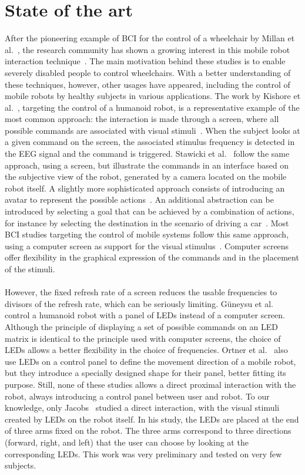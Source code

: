 \documentclass[smallextended]{svjour3}
\begin{document}
\section{State of the art}
\label{sec:soa}
After the pioneering example of BCI for the control of a wheelchair by Millan et al.~\cite{millan2004noninvasive}, the research community has shown a growing interest in this mobile robot interaction technique~\cite{Bi2013}. 
The main motivation behind these studies is to enable severely disabled people to control wheelchairs. 
With a better understanding of these techniques, however, other usages have appeared, including the control of mobile robots by healthy subjects in various applications. The work by Kishore et al.~\cite{kishore2014comparison}, targeting the control of a humanoid robot, is a representative example of the most common approach: the interaction is made through a screen, where all possible commands are associated with visual stimuli~\cite{Volosyak2009}. When the subject looks at a given command on the screen, the associated stimulus frequency is detected in the EEG signal and the command is triggered. Stawicki et al.~\cite{Stawicki2016} follow the same approach, using a screen, but illustrate the commands in an interface based on the subjective view of the robot, generated by  a camera located on the mobile robot itself. 
A slightly more sophisticated approach consists of introducing an avatar to represent the possible actions~\cite{Faller2010}. An additional abstraction can be introduced by selecting a goal that can be achieved by a combination of actions, for instance by selecting the destination in the scenario of driving a car~\cite{Fan2015}. 
Most BCI studies targeting the control of mobile systems follow this same approach, using a computer screen as support for the visual stimulus~\cite{Bi2013}. Computer screens offer flexibility in the graphical expression of the commands and in the placement of the stimuli. \\
\\
However, the fixed refresh rate of a screen reduces the usable frequencies to divisors of the refresh rate, which can be seriously limiting. G{\"{u}}neysu et al.~\cite{Guneysu2013} control a humanoid robot with a panel of LEDs instead of a computer screen. Although the principle of displaying a set of possible commands on an LED matrix is identical to the principle used with computer screens, the choice of LEDs allows a better flexibility in the choice of frequencies. Ortner et al.~\cite{Ortner2010} also use LEDs on a control panel to define the movement direction of a mobile robot, but they introduce a specially designed shape for their panel, better fitting its purpose. Still, none of these studies allows a direct proximal interaction with the robot, always introducing a control panel between user and robot. To our knowledge, only Jacobs~\cite{Jacobs2013} studied a direct interaction, with the visual stimuli created by LEDs on the robot itself. In his study, the LEDs are placed at the end of three arms fixed on the robot. The three arms correspond to three directions (forward, right, and left) that the user can choose by looking at the corresponding LEDs. This work was very preliminary and tested on very few subjects.\\
\end{document}
